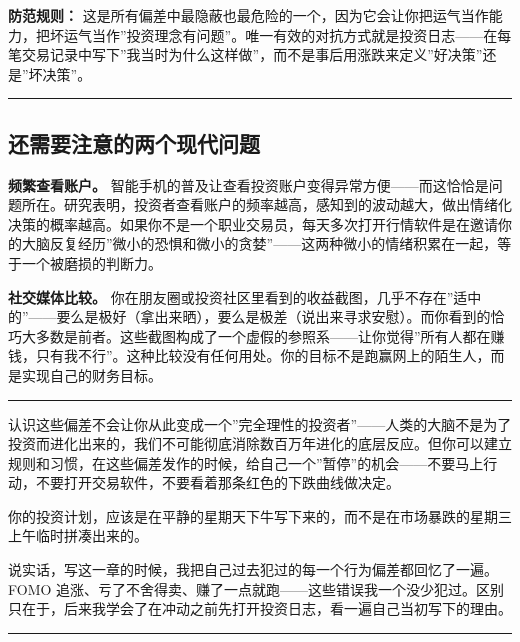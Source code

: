 \documentclass[a4paper,11pt,oneside,fontset=none,UTF8,zihao=-4]{ctexbook}
\begin{document}
\textbf{防范规则：}
这是所有偏差中最隐蔽也最危险的一个，因为它会让你把运气当作能力，把坏运气当作''投资理念有问题''。唯一有效的对抗方式就是投资日志------在每笔交易记录中写下''我当时为什么这样做''，而不是事后用涨跌来定义''好决策''还是''坏决策''。

\begin{center}{\color{dh-bronze}\rule{0.2\textwidth}{0.5pt}}\end{center}

\subsection{还需要注意的两个现代问题}\label{ux8fd8ux9700ux8981ux6ce8ux610fux7684ux4e24ux4e2aux73b0ux4ee3ux95eeux9898}

\textbf{频繁查看账户。}
智能手机的普及让查看投资账户变得异常方便------而这恰恰是问题所在。研究表明，投资者查看账户的频率越高，感知到的波动越大，做出情绪化决策的概率越高。如果你不是一个职业交易员，每天多次打开行情软件是在邀请你的大脑反复经历''微小的恐惧和微小的贪婪''------这两种微小的情绪积累在一起，等于一个被磨损的判断力。

\textbf{社交媒体比较。}
你在朋友圈或投资社区里看到的收益截图，几乎不存在''适中的''------要么是极好（拿出来晒），要么是极差（说出来寻求安慰）。而你看到的恰巧大多数是前者。这些截图构成了一个虚假的参照系------让你觉得''所有人都在赚钱，只有我不行''。这种比较没有任何用处。你的目标不是跑赢网上的陌生人，而是实现自己的财务目标。

\begin{center}{\color{dh-bronze}\rule{0.2\textwidth}{0.5pt}}\end{center}

认识这些偏差不会让你从此变成一个''完全理性的投资者''------人类的大脑不是为了投资而进化出来的，我们不可能彻底消除数百万年进化的底层反应。但你可以建立规则和习惯，在这些偏差发作的时候，给自己一个''暂停''的机会------不要马上行动，不要打开交易软件，不要看着那条红色的下跌曲线做决定。

你的投资计划，应该是在平静的星期天下牛写下来的，而不是在市场暴跌的星期三上午临时拼凑出来的。

说实话，写这一章的时候，我把自己过去犯过的每一个行为偏差都回忆了一遍。FOMO
追涨、亏了不舍得卖、赚了一点就跑------这些错误我一个没少犯过。区别只在于，后来我学会了在冲动之前先打开投资日志，看一遍自己当初写下的理由。

\begin{center}{\color{dh-bronze}\rule{0.2\textwidth}{0.5pt}}\end{center}
\end{document}
